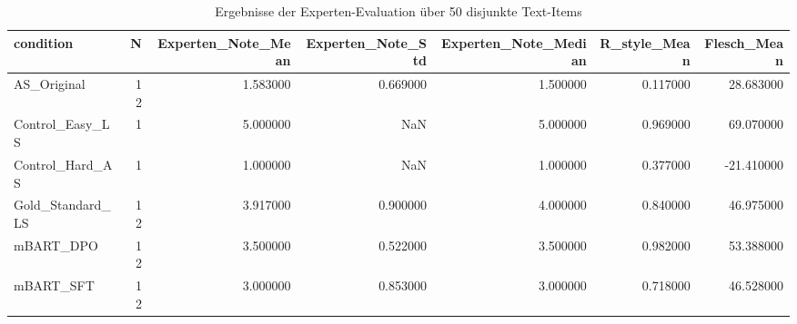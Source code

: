 \begin{table}
\caption{Ergebnisse der Experten-Evaluation über 50 disjunkte Text-Items}
\label{tab:expert_eval_results}
\begin{tabular}{lrrrrrr}
\toprule
condition & N & Experten_Note_Mean & Experten_Note_Std & Experten_Note_Median & R_style_Mean & Flesch_Mean \\
\midrule
AS_Original & 12 & 1.583000 & 0.669000 & 1.500000 & 0.117000 & 28.683000 \\
Control_Easy_LS & 1 & 5.000000 & NaN & 5.000000 & 0.969000 & 69.070000 \\
Control_Hard_AS & 1 & 1.000000 & NaN & 1.000000 & 0.377000 & -21.410000 \\
Gold_Standard_LS & 12 & 3.917000 & 0.900000 & 4.000000 & 0.840000 & 46.975000 \\
mBART_DPO & 12 & 3.500000 & 0.522000 & 3.500000 & 0.982000 & 53.388000 \\
mBART_SFT & 12 & 3.000000 & 0.853000 & 3.000000 & 0.718000 & 46.528000 \\
\bottomrule
\end{tabular}
\end{table}
